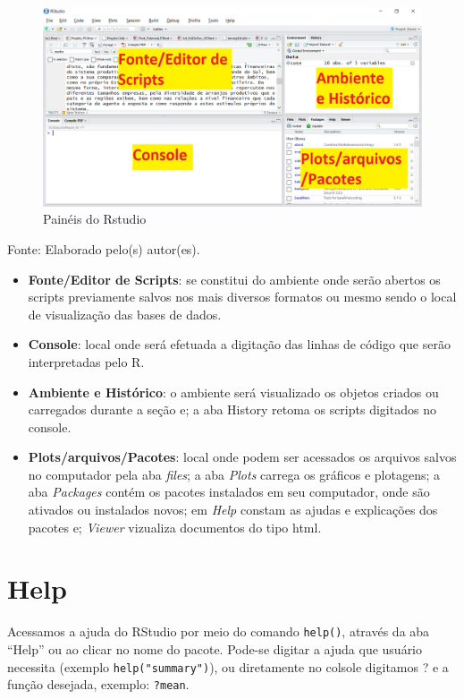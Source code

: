 \documentclass[12pt,brazil,oneside]{book}
\providecommand{\tightlist}{%
  \setlength{\itemsep}{0pt}\setlength{\parskip}{0pt}}
\begin{document}
\begin{figure}[H]

{\centering \includegraphics[width=0.8\linewidth]{paineis} 

}

\caption{Painéis do Rstudio}\label{fig:paineis1}
\end{figure}

Fonte: Elaborado pelo(s) autor(es).

\begin{itemize}
\tightlist
\item
  \textbf{Fonte/Editor de Scripts}: se constitui do ambiente onde serão
  abertos os scripts previamente salvos nos mais diversos formatos ou
  mesmo sendo o local de visualização das bases de dados.
\item
  \textbf{Console}: local onde será efetuada a digitação das linhas de
  código que serão interpretadas pelo R.
\item
  \textbf{Ambiente e Histórico}: o ambiente será visualizado os objetos
  criados ou carregados durante a seção e; a aba History retoma os
  scripts digitados no console.
\item
  \textbf{Plots/arquivos/Pacotes}: local onde podem ser acessados os
  arquivos salvos no computador pela aba \emph{files}; a aba
  \emph{Plots} carrega os gráficos e plotagens; a aba \emph{Packages}
  contém os pacotes instalados em seu computador, onde são ativados ou
  instalados novos; em \emph{Help} constam as ajudas e explicações dos
  pacotes e; \emph{Viewer} vizualiza documentos do tipo html.
\end{itemize}

\hypertarget{help}{%
\section{Help}\label{help}}

Acessamos a ajuda do RStudio por meio do comando \texttt{help()},
através da aba ``Help'' ou ao clicar no nome do pacote. Pode-se digitar
a ajuda que usuário necessita (exemplo \texttt{help("summary")}), ou
diretamente no colsole digitamos ? e a função desejada, exemplo:
\texttt{?mean}.
\end{document}

